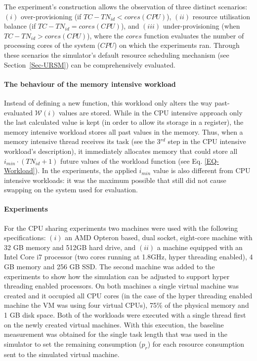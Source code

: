 \documentclass[sort, compress, 5p]{elsarticle}
\begin{document}
The experiment's construction allows the observation of three distinct scenarios: $(i)$ over-provisioning (if $TC-TN_{id}<cores(CPU)$), $(ii)$ resource utilisation balance (if $TC-TN_{id}=cores(CPU)$), and $(iii)$ under-provisioning (when $TC-TN_{id}>cores(CPU)$), where the $cores$ function evaluates the number of processing cores of the system ($CPU$) on which the experiments ran. Through these scenarios the simulator's default resource scheduling mechanism (see Section~\ref{Sec-URSM}) can be comprehensively evaluated.

\paragraph{The behaviour of the memory intensive workload} Instead of defining a new function, this workload only alters the way past-evaluated $\mathcal{W}(i)$ values are stored. While in the CPU intensive approach only the last calculated value is kept (in order to allow its storage in a register), the memory intensive workload stores all past values in the memory. Thus, when a memory intensive thread receives its task (see the 3$^{rd}$ step in the CPU intensive workload's description), it immediately allocates memory that could store all $i_{min}\cdot(TN_{id}+1)$ future values of the workload function (see Eq. \ref{EQ-Workload}). In the experiments, the applied $i_{min}$ value is also different from CPU intensive workloads: it was the maximum possible that still did not cause swapping on the system used for evaluation.

\paragraph{Experiments} For the CPU sharing experiments two machines were used with the following specifications: $(i)$ an AMD Opteron based, dual socket, eight-core machine with 32 GB memory and 512GB hard drive, and $(ii)$ a machine equipped with an Intel Core i7 processor (two cores running at 1.8GHz, hyper threading enabled), 4 GB memory and 256 GB SSD. The second machine was added to the experiments to show how the simulation can be adjusted to support hyper threading enabled processors. On both machines a single virtual machine was created and it occupied all CPU cores (in the case of the hyper threading enabled machine the VM was using four virtual CPUs), 75\% of the physical memory and 1 GB disk space. Both of the workloads were executed with a single thread first on the newly created virtual machines. With this execution, the baseline measurement was obtained for the single task length that was used in the simulator to set the remaining consumption ($p_r$) for each resource consumption sent to the simulated virtual machine.
\end{document}
